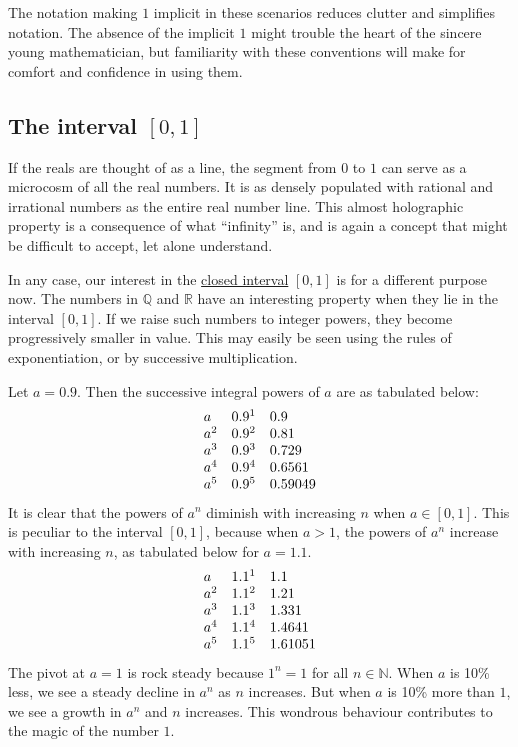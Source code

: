 \documentclass[
  a4paper,
]{article}
\begin{document}
The notation making \(1\) implicit in these scenarios reduces clutter
and simplifies notation. The absence of the implicit \(1\) might trouble
the heart of the sincere young mathematician, but familiarity with these
conventions will make for comfort and confidence in using them.

\subsection{\texorpdfstring{The interval
\([0, 1]\)}{The interval {[}0, 1{]}}}\label{the-interval-0-1}

If the reals are thought of as a line, the segment from \(0\) to \(1\)
can serve as a microcosm of all the real numbers. It is as densely
populated with rational and irrational numbers as the entire real number
line. This almost holographic property is a consequence of what
``infinity'' is, and is again a concept that might be difficult to
accept, let alone understand.

In any case, our interest in the
\href{https://mathworld.wolfram.com/ClosedInterval.html}{closed
interval} \([0, 1]\) is for a different purpose now. The numbers in
\(\mathbb{Q}\) and \(\mathbb{R}\) have an interesting property when they
lie in the interval \([0, 1]\). If we raise such numbers to integer
powers, they become progressively smaller in value. This may easily be
seen using the rules of exponentiation, or by successive multiplication.

Let \(a = 0.9\). Then the successive integral powers of \(a\) are as
tabulated below: \[
\begin{array}{l  r  l}
a & 0.9^1 & 0.9\\
a^2 & 0.9^2 & 0.81\\
a^3 & 0.9^3 & 0.729\\
a^4 & 0.9^4 & 0.6561\\
a^5 & 0.9^5 & 0.59049\\
\end{array}
\] It is clear that the powers of \(a^n\) diminish with increasing \(n\)
when \(a \in [0, 1]\). This is peculiar to the interval \([0, 1]\),
because when \(a > 1\), the powers of \(a^n\) increase with increasing
\(n\), as tabulated below for \(a=1.1\). \[
\begin{array}{l  r  l}
a & 1.1^1 & 1.1\\
a^2 & 1.1^2 & 1.21\\
a^3 & 1.1^3 & 1.331\\
a^4 & 1.1^4 & 1.4641\\
a^5 & 1.1^5 & 1.61051\\
\end{array}
\] The pivot at \(a = 1\) is rock steady because \(1^n = 1\) for all
\(n \in \mathbb{N}\). When \(a\) is 10\% less, we see a steady decline
in \(a^n\) as \(n\) increases. But when \(a\) is 10\% more than \(1\),
we see a growth in \(a^n\) and \(n\) increases. This wondrous behaviour
contributes to the magic of the number \(1\).
\end{document}
